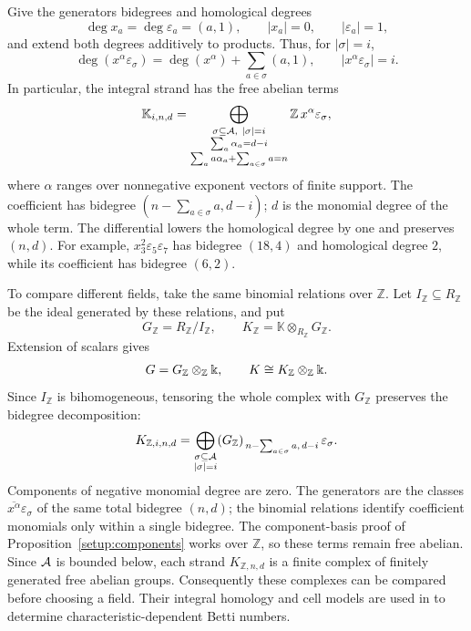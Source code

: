 \label{setup:koszul-grading}
Give the generators bidegrees and homological degrees
\[
 \deg x_a=\deg\varepsilon_a=(a,1),\qquad
 |x_a|=0,\qquad |\varepsilon_a|=1,
\]
and extend both degrees additively to products. Thus, for $|\sigma|=i$,
\[
 \deg(x^\alpha\varepsilon_\sigma)
   =\deg(x^\alpha)+\sum_{a\in\sigma}(a,1),
 \qquad |x^\alpha\varepsilon_\sigma|=i.
\]
In particular, the integral strand has the free abelian terms
\[
 \mathbb K_{i,n,d}
 =\bigoplus_{\substack{\sigma\subseteq\mathcal A,\ |\sigma|=i\\
          \sum_a\alpha_a=d-i\\
          \sum_a a\alpha_a+\sum_{a\in\sigma}a=n}}
       \mathbb Z\,x^\alpha\varepsilon_\sigma,
\]
where $\alpha$ ranges over nonnegative exponent vectors of finite
support. The coefficient has bidegree
$(n-\sum_{a\in\sigma}a,d-i)$; $d$ is the monomial degree of the whole
term. The differential lowers the homological degree by one and
preserves $(n,d)$.
For example, $x_3^2\varepsilon_5\varepsilon_7$ has bidegree $(18,4)$
and homological degree $2$, while its coefficient has bidegree $(6,2)$.

To compare different fields, take the same binomial relations over
$\mathbb Z$. Let $I_{\mathbb Z}\subseteq R_{\mathbb Z}$ be the ideal
generated by these relations, and put
\[
 G_{\mathbb Z}=R_{\mathbb Z}/I_{\mathbb Z},\qquad
 K_{\mathbb Z}=\mathbb K\otimes_{R_{\mathbb Z}}G_{\mathbb Z}.
\]
Extension of scalars gives
\[
 G=G_{\mathbb Z}\otimes_{\mathbb Z}\Bbbk,\qquad
 K\cong K_{\mathbb Z}\otimes_{\mathbb Z}\Bbbk.
\]
Since $I_{\mathbb Z}$ is bihomogeneous, tensoring the whole complex
with $G_{\mathbb Z}$ preserves the bidegree decomposition:
\[
 K_{\mathbb Z,i,n,d}
 =\bigoplus_{\substack{\sigma\subseteq\mathcal A\\|\sigma|=i}}
   (G_{\mathbb Z})_{\,n-\sum_{a\in\sigma}a,\,d-i}
   \,\varepsilon_\sigma.
\]
Components of negative monomial degree are zero. The generators are
the classes $\overline{x^\alpha}\varepsilon_\sigma$ of the same
total bidegree $(n,d)$; the binomial relations identify coefficient
monomials only within a single bidegree.
The component-basis proof of Proposition~\ref{setup:components} works
over $\mathbb Z$, so these terms remain free abelian. Since $\mathcal A$ is
bounded below, each strand $K_{\mathbb Z,n,d}$ is a finite complex of finitely generated
free abelian groups. Consequently these complexes can be compared
before choosing a field. Their integral homology and cell models are
used in \cite{CompanionTopology} to determine characteristic-dependent
Betti numbers.


